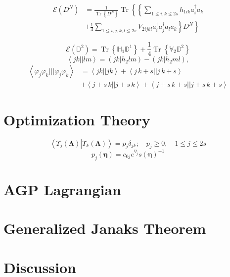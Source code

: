 \documentclass[aps,preprint]{revtex4}%
\begin{document}
\begin{align*}
\mathcal{E}\left(  D^{N}\right)   &  =\frac{1}{\operatorname{Tr}\left\{
D^{N}\right\}  }\operatorname{Tr}\left\{  \left\{  \sum_{1\leq i,k\leq
2s}h_{1ik}a_{i}^{\dagger}a_{k}\right.  \right. \\
&  +\left.  \left.  \frac{1}{4}\sum_{1\leq i,j,k,l\leq2s}V_{2ijkl}%
a_{i}^{\dagger}a_{j}^{\dagger}a_{l}a_{k}\right\}  D^{N}\right\}
\end{align*}
%

\[
\mathcal{E}\left(  \mathbb{D}^{2}\right)  =\operatorname{Tr}\left\{
\mathbb{H}_{1}\mathbb{D}^{1}\right\}  +\frac{1}{4}\operatorname{Tr}\left\{
\mathbb{V}_{2}\mathbb{D}^{2}\right\}
\]%
\[
\left\langle jk||lm\right\rangle =\left(  \left.  jk\right\vert h_{2}%
lm\right)  -\left(  \left.  jk\right\vert h_{2}ml\right)  ,
\]%
\begin{align*}
\left\langle \varphi_{j}\varphi_{k}|||\varphi_{j}\varphi_{k}\right\rangle  &
=\left\langle jk||jk\right\rangle +\left\langle j\,k+s||j\,k+s\right\rangle \\
&  +\left\langle j+s\,k||j+s\,k\right\rangle +\left\langle
j+s\,k+s||j+s\,k+s\right\rangle
\end{align*}


\section{Optimization Theory\label{Optimiz}}%

\[
\left\langle \left.  \Upsilon_{j}\left(  \mathbf{\Lambda}\right)  \right\vert
\Upsilon_{k}\left(  \mathbf{\Lambda}\right)  \right\rangle =p_{j}\delta
_{jk};\quad p_{j}\geq0,\quad1\leq j\leq2s
\]%
\[
p_{j}\left(  \mathbf{\eta}\right)  =c_{0j}e^{\eta_{j}}\mathit{s}\left(
\mathbf{\eta}\right)  ^{-1}%
\]


\section{\bigskip AGP Lagrangian\label{Lagran}}

\section{\bigskip Generalized Janaks Theorem\label{General}}

\section{\bigskip Discussion\label{Discuss}}
\end{document}
